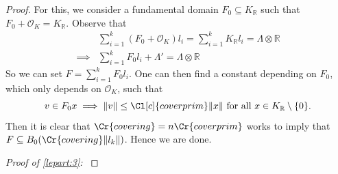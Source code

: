 \documentclass{amsart}
\theoremstyle{definition}
\theoremstyle{remark}
\newcommand{\OK}{\mathcal{O}_K}
\newcommand{\KR}{K_\mathbb{R}}
\begin{document}
\begin{proof}
For this, we consider a fundamental domain $F_{0} \subseteq \KR$ such that $F_{0} + \OK = \KR$. 
Observe that 
\begin{align}
     &  
    \sum_{i=1}^{k}(F_{0} + \OK) l_{i} = \sum_{i=1}^{k} \KR l_{i} = \Lambda \otimes \mathbb{R} \\ 
    \implies & 
    \sum_{i=1}^{k}F_{0} l_{i} + \Lambda'  = \Lambda \otimes \mathbb{R} 
\end{align}
So we can set $F = \sum_{i=1}^{k}F_{0} l_{i}$. One can then find a constant depending on $F_{0}$, which only depends on $\OK$, such that
\begin{equation}
v \in F_{0} x \implies  \|v\| \leq \Cl[c]{coverprim} \|x\| \text{ for all }x \in \KR \setminus\{0\}.
\end{equation}
Then it is clear that $\Cr{covering} = n \Cr{coverprim}$ works to imply that $F \subseteq B_{0}(\Cr{covering} \|l_{k}\|)$. Hence we are done.

    { \em Proof of \ref{lepart:3}: }


\end{proof}
\end{document}
